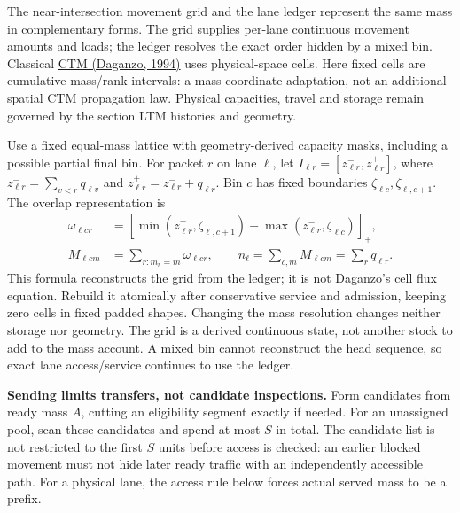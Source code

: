 \documentclass[10pt,a4paper]{article}
\newenvironment{revision}{\begingroup\color{revisionred}}{\par\endgroup}
\begin{document}
\begin{revision}
The near-intersection movement grid and the lane ledger represent the
same mass in complementary forms. The grid supplies per-lane continuous
movement amounts and loads; the ledger resolves the exact order hidden
by a mixed bin. Classical
\href{https://doi.org/10.1016/0191-2615(94)90002-7}{CTM (Daganzo, 1994)}
uses physical-space cells. Here fixed cells are cumulative-mass/rank
intervals: a mass-coordinate adaptation, not an additional spatial CTM
propagation law. Physical capacities, travel and storage remain governed
by the section LTM histories and geometry.

Use a fixed equal-mass lattice with geometry-derived capacity masks,
including a possible partial final bin. For packet $r$ on lane $\ell$,
let $I_{\ell r}=[z^-_{\ell r},z^+_{\ell r}]$, where
$z^-_{\ell r}=\sum_{v<r}q_{\ell v}$ and
$z^+_{\ell r}=z^-_{\ell r}+q_{\ell r}$.
Bin $c$ has fixed boundaries $\zeta_{\ell c},\zeta_{\ell,c+1}$.
The overlap representation is
\begin{equation}
 \begin{aligned}
 \omega_{\ell cr}&=
 [\min(z^+_{\ell r},\zeta_{\ell,c+1})
           -\max(z^-_{\ell r},\zeta_{\ell c})]_+,\\
 M_{\ell cm}&=\sum_{r:m_r=m}\omega_{\ell cr},\qquad
 n_\ell=\sum_{c,m}M_{\ell cm}=\sum_rq_{\ell r}.
 \end{aligned}
 \label{eq:grid}
\end{equation}
This formula reconstructs the grid from the ledger; it is not Daganzo's
cell flux equation. Rebuild it atomically after conservative service and
admission, keeping zero cells in fixed padded shapes. Changing the mass
resolution changes neither storage nor geometry. The grid is a derived
continuous state, not another stock to add to the mass account. A mixed
bin cannot reconstruct the head sequence, so exact lane access/service
continues to use the ledger.
\end{revision}

\textbf{Sending limits transfers, not candidate inspections.}
Form candidates from ready mass $A$, cutting an eligibility segment
exactly if needed. For an unassigned pool, scan these candidates and
spend at most $S$ in total. The candidate list is not restricted to the first $S$ units before access
is checked: an earlier blocked movement must not hide later ready traffic
with an independently accessible path. For a physical lane, the access rule below forces
actual served mass to be a prefix.
\end{document}

